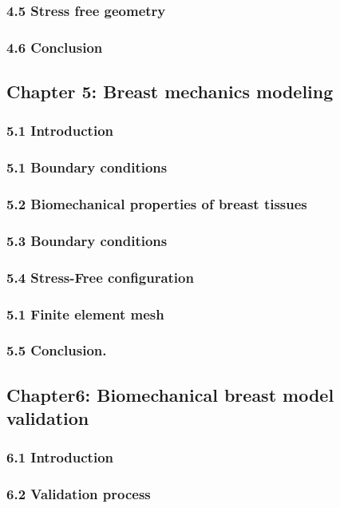 \subsubsection*{4.5 Stress free geometry} 
\subsubsection*{4.6 Conclusion }
\subsection*{Chapter 5: Breast mechanics modeling}
\subsubsection*{5.1 Introduction }
\subsubsection*{5.1 Boundary conditions }
\subsubsection*{5.2 Biomechanical properties of breast tissues }
\subsubsection*{5.3 Boundary conditions }
\subsubsection*{5.4 Stress-Free configuration }
\subsubsection*{5.1 Finite element mesh }
\subsubsection*{5.5 Conclusion. }
\newpage
\subsection*{Chapter6: Biomechanical breast model validation }
\subsubsection*{6.1 Introduction }
\subsubsection*{6.2 Validation process }
